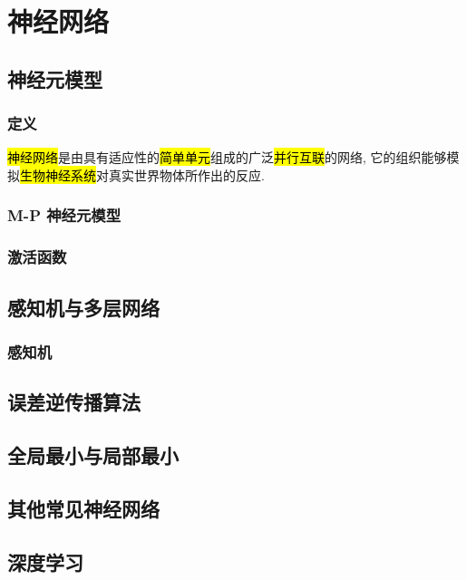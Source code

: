 \newpage
\section{神经网络}
\subsection{神经元模型}
\subsubsection{定义}
\hl{神经网络}是由具有适应性的\hl{简单单元}组成的广泛\hl{并行互联}的网络, 它的组织能够模拟\hl{生物神经系统}对真实世界物体所作出的反应. 

\subsubsection{M-P 神经元模型}

\subsubsection{激活函数}

\subsection{感知机与多层网络}
\subsubsection{感知机}



\subsection{误差逆传播算法}
\subsection{全局最小与局部最小}
\subsection{其他常见神经网络}
\subsection{深度学习}

